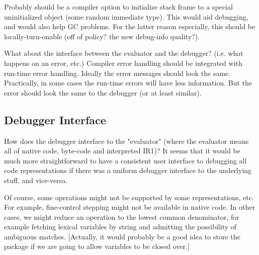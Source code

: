 Probably should be a compiler option to initialize stack frame to a special
uninitialized object (some random immediate type).  This would aid debugging,
and would also help GC problems.  For the latter reason especially, this should
be locally-turn-onable (off of policy?  the new debug-info quality?).


What about the interface between the evaluator and the debugger? (i.e. what
happens on an error, etc.)  Compiler error handling should be integrated with
run-time error handling.  Ideally the error messages should look the same.
Practically, in some cases the run-time errors will have less information.  But
the error should look the same to the debugger (or at least similar).



\subsection{Debugger Interface}

How does the debugger interface to the "evaluator" (where the evaluator means
all of native code, byte-code and interpreted IR1)?  It seems that it would be
much more straightforward to have a consistent user interface to debugging
all code representations if there was a uniform debugger interface to the
underlying stuff, and vice-versa.  

Of course, some operations might not be supported by some representations, etc.
For example, fine-control stepping might not be available in native code.
In other cases, we might reduce an operation to the lowest common denominator,
for example fetching lexical variables by string and admitting the possibility
of ambiguous matches.  [Actually, it would probably be a good idea to store the
package if we are going to allow variables to be closed over.]

